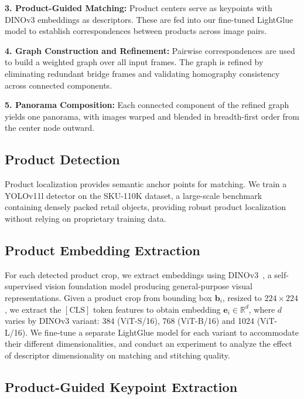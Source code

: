 \documentclass[10pt,twocolumn,letterpaper]{article}
\begin{document}
\noindent\textbf{3. Product-Guided Matching:} Product centers serve as keypoints with DINOv3 embeddings as descriptors. These are fed into our fine-tuned LightGlue model to establish correspondences between products across image pairs.

\noindent\textbf{4. Graph Construction and Refinement:} Pairwise correspondences are used to build a weighted graph over all input frames. The graph is refined by eliminating redundant bridge frames and validating homography consistency across connected components.

\noindent\textbf{5. Panorama Composition:} Each connected component of the refined graph yields one panorama, with images warped and blended in breadth-first order from the center node outward.

\subsection{Product Detection}
\label{subsec:detection}

Product localization provides semantic anchor points for matching.
We train a YOLOv11l detector on the SKU-110K dataset, a large-scale benchmark containing densely packed retail objects, providing robust product localization without relying on proprietary training data.


\subsection{Product Embedding Extraction}
\label{subsec:embedding}

For each detected product crop, we extract embeddings using DINOv3~\cite{dinov3}, a self-supervised vision foundation model producing general-purpose visual representations.
Given a product crop from bounding box $\mathbf{b}_i$, resized to $224 \times 224$, we extract the $[\mathrm{CLS}]$ token features to obtain embedding $\mathbf{e}_i \in \mathbb{R}^{d}$, where $d$ varies by DINOv3 variant: 384 (ViT-S/16), 768 (ViT-B/16) and 1024 (ViT-L/16).
We fine-tune a separate LightGlue model for each variant to accommodate their different dimensionalities, and conduct an experiment to analyze the effect of descriptor dimensionality on matching and stitching quality.

\subsection{Product-Guided Keypoint Extraction}
\label{subsec:keypoints}
\end{document}
